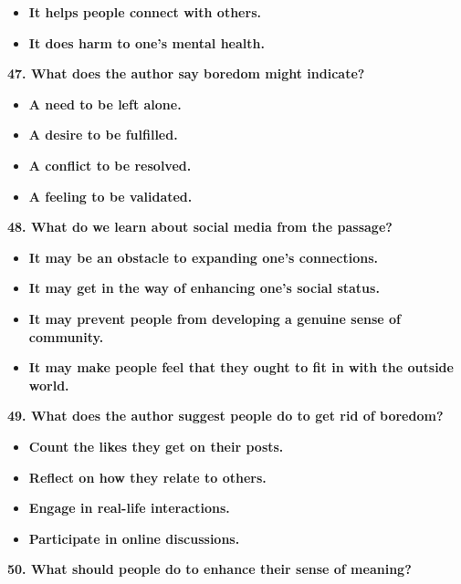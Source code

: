 \documentclass[UTF8,11pt]{ctexart}
\begin{document}
\begin{itemize}[leftmargin=2em,itemsep=.2em,topsep=.4em]\item[C.] \textbf{It helps people connect with others.}
\item[D.] \textbf{It does harm to one's mental health.}
\end{itemize}

\textbf{47. What does the author say boredom might indicate?}


\begin{itemize}[leftmargin=2em,itemsep=.2em,topsep=.4em]\item[A.] \textbf{A need to be left alone.}
\item[B.] \textbf{A desire to be fulfilled.}
\item[C.] \textbf{A conflict to be resolved.}
\item[D.] \textbf{A feeling to be validated.}
\end{itemize}

\textbf{48. What do we learn about social media from the passage?}


\begin{itemize}[leftmargin=2em,itemsep=.2em,topsep=.4em]\item[A.] \textbf{It may be an obstacle to expanding one's connections.}
\item[B.] \textbf{It may get in the way of enhancing one's social status.}
\item[C.] \textbf{It may prevent people from developing a genuine sense of community.}
\item[D.] \textbf{It may make people feel that they ought to fit in with the outside world.}
\end{itemize}

\textbf{49. What does the author suggest people do to get rid of boredom?}


\begin{itemize}[leftmargin=2em,itemsep=.2em,topsep=.4em]\item[A.] \textbf{Count the likes they get on their posts.}
\item[B.] \textbf{Reflect on how they relate to others.}
\item[C.] \textbf{Engage in real-life interactions.}
\item[D.] \textbf{Participate in online discussions.}
\end{itemize}

\textbf{50. What should people do to enhance their sense of meaning?}
\end{document}
